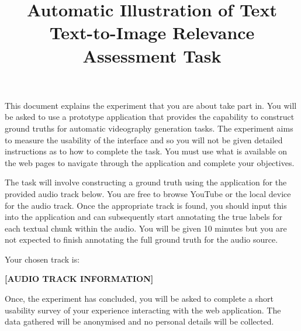 \documentclass[]{article}
\title{\textbf{Automatic Illustration of Text}\\ \vspace{6mm}
    \Large Text-to-Image Relevance Assessment Task}
\date{}
\begin{document}
\maketitle
\noindent
This document explains the experiment that you are about take part in. You will be asked to use a prototype application that provides the capability to construct ground truths for automatic videography generation tasks. The experiment aims to measure the usability of the interface and so you will not be given detailed instructions as to how to complete the task. You must use what is available on the web pages to navigate through the application and complete your objectives.

\vspace{6mm}
\noindent
The task will involve constructing a ground truth using the application for the provided audio track below. You are free to browse YouTube or the local device for the audio track. Once the appropriate track is found, you should input this into the application and can subsequently start annotating the true labels for each textual chunk within the audio. You will be given 10 minutes but you are not expected to finish annotating the full ground truth for the audio source.

\vspace{6mm}
\noindent
Your chosen track is: 

\begin{center}
    \textbf{[AUDIO TRACK INFORMATION]}
\end{center}

\vspace{6mm}
\noindent
Once, the experiment has concluded, you will be asked to complete a short usability survey of your experience interacting with the web application. The data gathered will be anonymised and no personal details will be collected.
\end{document}
